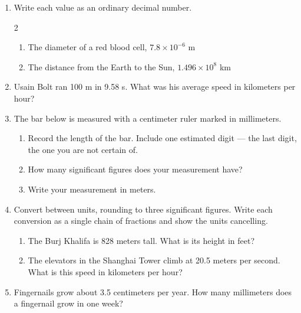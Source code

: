 \documentclass[12pt, twoside]{article}
\begin{document}
\begin{enumerate}[itemsep=0.6cm]
\item Write each value as an ordinary decimal number.
  \begin{multicols}{2}
    \raggedright
    \begin{enumerate}
      \item The diameter of a red blood cell, $7.8 \times 10^{-6}$ m
      \item The distance from the Earth to the Sun, $1.496 \times 10^{8}$ km
    \end{enumerate}
  \end{multicols} \vspace{1.4cm}

\item Usain Bolt ran 100 m in 9.58 s. What was his average speed in kilometers per
  hour?

\newpage

\item The bar below is measured with a centimeter ruler marked in millimeters.

\begin{center}
\end{center}

  \begin{enumerate}[itemsep=1.0cm]
    \item Record the length of the bar. Include one estimated digit --- the last
      digit, the one you are not certain of.
    \item How many significant figures does your measurement have?
    \item Write your measurement in meters.
  \end{enumerate} \vspace{1.0cm}

\item Convert between units, rounding to three significant figures. Write each
  conversion as a single chain of fractions and show the units cancelling.
  \begin{enumerate}[itemsep=2.6cm]
    \item The Burj Khalifa is 828 meters tall. What is its height in feet?
    \item The elevators in the Shanghai Tower climb at 20.5 meters per second. What
      is this speed in kilometers per hour?
  \end{enumerate} \vspace{2.4cm}

\item Fingernails grow about 3.5 centimeters per year. How many millimeters does a
  fingernail grow in one week?

\end{enumerate}
\end{document}
